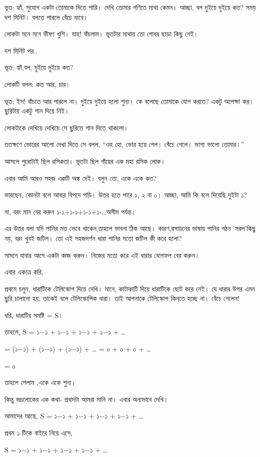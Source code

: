 \documentclass[
]{book}
\begin{document}
ভূত: হ্যাঁ, সুযোগ একটা তোমাকে দিতে পারি। দেখি তোমার গণিতে মাথা কেমন। আচ্ছা, বল দুইয়ে দুইয়ে কত? সময় দশ মিনিট। বলতে পারলে বেঁচে যাবে।

লোকটা মনে মনে ভীষণ খুশি। যাহ! বাঁচলাম। ভূতটার মাথায় তো গোবর ছাড়া কিছু নেই।

দশ মিনিট পর..

ভূত: হ্যাঁ,বল, দুইয়ে দুইয়ে কত?

লোকটি বলল: কত আর, চার।

ভূত: ইস! বাঁচতে আর পারলে না। দুইয়ে দুইয়ে হলো শুন্য। কে বলেছে তোমাকে যোগ করতে? একটু অপেক্ষা কর। ছুরিটায় একটু শান দিয়ে নিই।

লোকটাকে দেখিয়ে দেখিয়ে সে ছুরিতে শান দিতে থাকলো।

ততক্ষণে ভোরের আলো দেখা দিতে সে বলল, ``ওহ হো, ভোর হয়ে গেল। বেঁচে গেলে। ভাগ্য ভালো তোমার।''

আসলে পুরোটাই ছিল রসিকতা। ভূতটা ছিল গাঁয়ের এক মহা রসিক লোক।

এবার আমি আরও সহজ একটি অঙ্ক দেই। বলুন তো, একে একে কত?

ভাবছেন, কোনটা বলে আবার বিপদে পড়ি। উত্তর হতে পারে ১, ২ বা ০। আচ্ছা, আমি কি বলে দিয়েছি দুইটা ১?

না, বরং মান বের করুন ১-১+১-১+১-১+১-\ldots অসীম পর্যন্ত।

এর উত্তর বলা যদি পানির মত ভেবে থাকেন,তাহলে ভাবনা ঠিক আছে। কারণ,রসায়নের ভাষায় পানির গঠন 'সরল'কিছু নয়, বরং খুবই জটিল। তো এই সহজদর্শন ধারা পানির মতো জটিল কী করে হলো?

সামনে যাবার আগে একটা কাজ করুন। নিজের মতো করে এই ধারার যোগফল বের করুন।

এবার একত্রে করি,

প্রথমে চলুন, ধারাটিকে টেলিস্কোপ দিয়ে দেখি। মানে, কাটাকাটি দিয়ে ধারাটিকে ছোট করে নেই। যে ধারার উপর এমন ছুরি চালানো হয়, তাকেই বলে টেলিস্কোপিক ধারা। তাই আপনাকে টেলিস্কোপ কিনতে হচ্ছে না। বেঁচে গেলেন!

ধরি, ধারাটির সমষ্টি = S।

তাহলে, S = ১−১ + ১−১ + ১−১ + ১−১ + \ldots{}

= (১−১) + (১−১) + (১−১) + \ldots{} = ০ + ০ + ০ + \ldots{}

= ০

তাহলে পেলাম ,একে একে শুন্য।

কিন্তু ভদ্রলোকের এক কথা- প্রবাদটা আমরা মানি না। এবার অন্যভাবে দেখি।

আমাদের আছে, S = ১−১ + ১−১ + ১−১ + ১−১ + \ldots{}

প্রথম ১ টিকে বাইরে নিয়ে এসে,

S = ১−১ + ১−১ + ১−১ + ১−১ + \ldots{}
\end{document}
